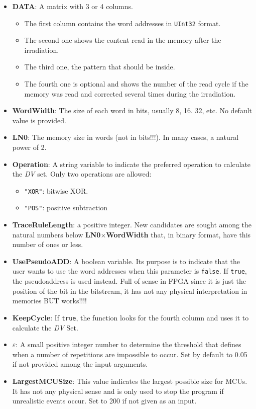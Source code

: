 \begin{itemize}
\begin{itemize}
 		\item   \textbf{DATA}: A matrix with 3 or 4 columns. 
 		\begin{itemize}
 			\item The first column contains the word addresses in \texttt{UInt32} format.
 			\item The second one shows the content read in the memory after the irradiation.
 			\item The third one, the pattern that should be inside.
 			\item  The fourth one is optional and shows the number of the read cycle if the   memory was read and corrected several times during the irradiation.
 		\end{itemize}
 		\item   \textbf{WordWidth}: The size of each word in bits, usually 8, 16. 32, etc. No default value is provided.
 		\item   \textbf{LN0}: The memory size in words (not in bits!!!). In many cases, a natural power of 2.
 		\item   \textbf{Operation}: A string variable to indicate the preferred operation to calculate
 		the \textit{DV} set. Only two operations are allowed: 
 		\begin{itemize}
 			\item \texttt{"XOR"}: bitwise XOR.
 			\item\texttt{"POS"}: positive subtraction
 		\end{itemize}
 		\item \textbf{TraceRuleLength}: a positive integer. New candidates are sought among the natural numbers below \textbf{LN0}\(\times\)\textbf{WordWidth} that, in binary format, have this number of ones or less.
 		\item  \textbf{UsePseudoADD}: A boolean variable. Its purpose is to indicate that the user wants to use the word addresses when this parameter is \texttt{false}. If \texttt{true}, the pseudoaddress is used instead. Full of sense in FPGA since it is just the position  of the bit in the bitstream, it has not any physical interpretation in memories BUT works!!!!
 		\item   \textbf{KeepCycle}: If \texttt{true}, the function looks for the fourth column and uses it to calculate the \textit{DV} Set.
 		\item   \textbf{\(\varepsilon\)}: A small positive integer number to determine the threshold that defines when a number of repetitions are impossible to occur. Set by default to 0.05 if not provided among the input arguments.
 		\item  \textbf{LargestMCUSize}: This value indicates the largest possible size for MCUs. It has not any physical sense  and is only used to stop the program if unrealistic events occur. Set to 200 if not given as an input.
 		

\end{itemize}
\end{itemize}
